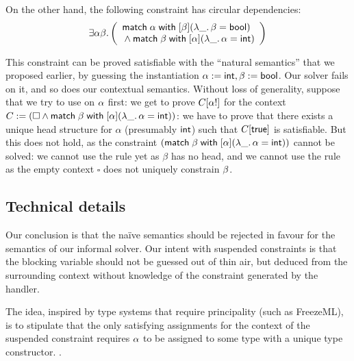 \documentclass[acmsmall,screen,nonacm]{acmart}
\begin{document}
On the other hand, the following constraint has circular dependencies:
$$
  \exists \alpha \beta.
  \left(\begin{array}{l}
    \mathopen{}\mathrel{\mathsf{match}} \alpha \mathrel{\mathsf{with}} [ \beta ] (\lambda {{\_}}. \,{\beta = \mathsf{bool}}) \\
    {} \wedge \mathopen{}\mathrel{\mathsf{match}} \beta \mathrel{\mathsf{with}} [ \alpha ] (\lambda {{\_}}. \,{\alpha = \mathsf{int}})
  \end{array}\right)
$$

This constraint can be proved satisfiable with the ``natural semantics''
that we proposed earlier, by guessing the instantiation $\alpha := \mathsf{int}, \beta
:= \mathsf{bool}$. Our solver fails on it, and so does our contextual
semantics. Without loss of generality, suppose that we try to use
 on $\alpha$ first: we get to prove $C[\alpha !]$ for the
context $C := (\square \wedge \mathopen{}\mathrel{\mathsf{match}} \beta \mathrel{\mathsf{with}} [ \alpha ] (\lambda {{\_}}. \,{\alpha =
\mathsf{int}}))$: we have to prove that there exists a unique head structure for
$\alpha$ (presumably $\mathsf{int}$) such that $C[\mathsf{true}]$ is satisfiable. But
this does not hold, as the constraint $(\mathopen{}\mathrel{\mathsf{match}} \beta \mathrel{\mathsf{with}} [ \alpha ] (\lambda {{\_}}. \,{\alpha = \mathsf{int}}))$ cannot be solved: we cannot use the  rule
yet as $\beta$ has no head, and we cannot use the  rule as
the empty context $\square$ does not uniquely constrain $\beta$.

\subsection{Technical details}








Our conclusion is that the na\"ive semantics should be rejected in favour
for the semantics of our informal solver. Our intent with suspended
constraints is that the blocking variable should not be guessed out of thin
air, but deduced from the surrounding context without knowledge of the
constraint generated by the handler.

The idea, inspired by type systems that require principality (such as
FreezeML), is to stipulate that the only satisfying assignments for the
context of the suspended constraint requires $\alpha$ to be assigned to some
type with a unique type constructor.
. 
\end{document}
